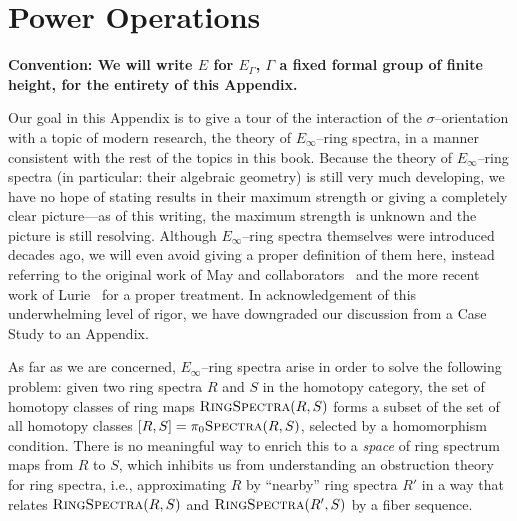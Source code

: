 


\chapter{Power Operations}\label{PowerOpnsChapter}

\begin{center}
\textbf{Convention: We will write \(E\) for \(E_\Gamma\), \(\Gamma\) a fixed formal group of finite height, for the entirety of this Appendix.}
\end{center}

Our goal in this Appendix is to give a tour of the interaction of the \(\sigma\)--orientation with a topic of modern research, the theory of \(E_\infty\)--ring spectra, in a manner consistent with the rest of the topics in this book.  Because the theory of \(E_\infty\)--ring spectra (in particular: their algebraic geometry) is still very much developing, we have no hope of stating results in their maximum strength or giving a completely clear picture---as of this writing, the maximum strength is unknown and the picture is still resolving.  Although \(E_\infty\)--ring spectra themselves were introduced decades ago, we will even avoid giving a proper definition of them here, instead referring to the original work of May and collaborators~\cite{EKMM} and the more recent work of Lurie~\cite[Chapter 7]{LurieHA} for a proper treatment.  In acknowledgement of this underwhelming level of rigor, we have downgraded our discussion from a Case Study to an Appendix.

As far as we are concerned, \(E_\infty\)--ring spectra arise in order to solve the following problem: given two ring spectra \(R\) and \(S\) in the homotopy category, the set of homotopy classes of ring maps \(\normalfont\textsc{RingSpectra}(R, S)\) forms a subset of the set of all homotopy classes \([R, S] = \pi_0 \normalfont\textsc{Spectra}(R, S)\), selected by a homomorphism condition.  There is no meaningful way to enrich this to a \emph{space} of ring spectrum maps from \(R\) to \(S\), which inhibits us from understanding an obstruction theory for ring spectra, i.e., approximating \(R\) by ``nearby'' ring spectra \(R'\) in a way that relates \(\normalfont\textsc{RingSpectra}(R, S)\) and \(\normalfont\textsc{RingSpectra}(R', S)\) by a fiber sequence.

